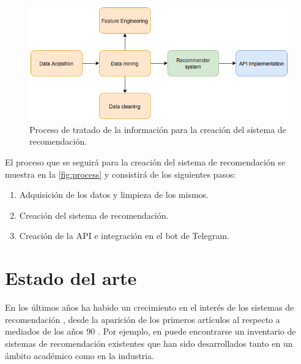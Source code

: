 \begin{figure}[h]
    \centering
    \captionsetup{width=10cm}
    \includegraphics[width=12cm]{contenido/imagenes/initial.png}
    \caption{Proceso de tratado de la información para la creación del sistema de recomendación.}
    \label{fig:process}
\end{figure}

El proceso que se seguirá para la creación del sistema de recomendación se muestra en la \autoref{fig:process} y consistirá de los siguientes pasos:
\begin{enumerate}
    \item Adquisición de los datos y limpieza de los mismos.
    \item Creación del sistema de recomendación.
    \item Creación de la API e integración en el bot de Telegram.
\end{enumerate}


\section{Estado del arte}\label{sec:soa}

En los últimos años ha habido un crecimiento en el interés de los sistemas de recomendación \cite{Abdomavicius}, desde la aparición de los primeros artículos al respecto a mediados de los años 90 \cite{resnick}. Por ejemplo, en \cite{nageswara} puede encontrarse un inventario de sistemas de recomendación existentes que han sido desarrollados tanto en un ámbito académico como en la industria.\\

